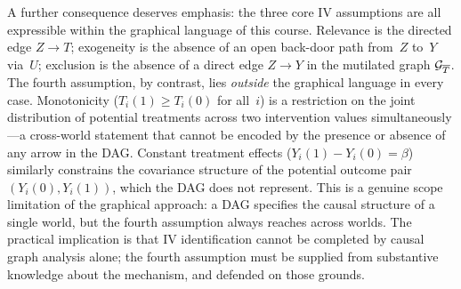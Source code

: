 \documentclass[master.tex]{subfiles}
\begin{document}
\begin{remark}
A further consequence deserves emphasis: the three core IV assumptions
are all expressible within the graphical language of this course.
Relevance is the directed edge $Z \to T$; exogeneity is the absence
of an open back-door path from~$Z$ to~$Y$ via~$U$; exclusion is the
absence of a direct edge $Z \to Y$ in the mutilated graph
$\mathcal{G}_{\overline{T}}$.  The fourth assumption, by contrast, lies
\emph{outside} the graphical language in every case.  Monotonicity
($T_i(1) \geq T_i(0)$ for all~$i$) is a restriction on the joint
distribution of potential treatments across two intervention values
simultaneously---a cross-world statement that cannot be encoded by
the presence or absence of any arrow in the DAG.  Constant treatment
effects ($Y_i(1) - Y_i(0) = \beta$) similarly constrains the
covariance structure of the potential outcome pair $(Y_i(0), Y_i(1))$,
which the DAG does not represent.  This is a genuine scope limitation
of the graphical approach: a DAG specifies the causal structure of a
single world, but the fourth assumption always reaches across worlds.
The practical implication is that IV identification cannot be
completed by causal graph analysis alone; the fourth assumption must
be supplied from substantive knowledge about the mechanism, and
defended on those grounds.
\end{remark}
\end{document}
